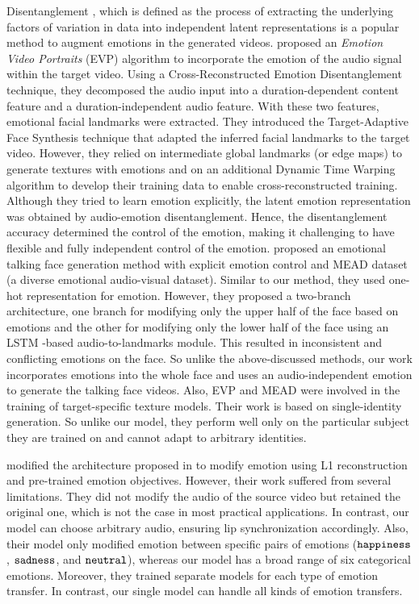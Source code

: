 \documentclass[accepted]{uai2023}
\begin{document}
Disentanglement \citep{Bengio2012RepresentationLA, higgins2017betavae, Mathieu2018DisentanglingDI, Shukla2019PrOSePO, Bhagat2020DisContSV, Bhagat2020DisentanglingMF}, which is defined as the process of extracting the underlying factors of variation in data into independent latent representations is a popular method to augment emotions in the generated videos.
\citet{Ji_2021_CVPR} proposed an \emph{Emotion Video Portraits} (EVP) algorithm to incorporate the emotion of the audio signal within the target video. Using a Cross-Reconstructed Emotion Disentanglement technique, they decomposed the audio input into a duration-dependent content feature and a duration-independent audio feature. With these two features, emotional facial landmarks were extracted. They introduced the Target-Adaptive Face Synthesis technique that adapted the inferred facial landmarks to the target video. However, they relied on intermediate global landmarks (or edge maps) to generate textures with emotions and on an additional Dynamic Time Warping \citep{berndt1994using} algorithm to develop their training data to enable cross-reconstructed training. Although they tried to learn emotion explicitly, the latent emotion representation was obtained by audio-emotion disentanglement. Hence, the disentanglement accuracy determined the control of the emotion, making it challenging to have flexible and fully independent control of the emotion. \citet{wang2020mead} proposed an emotional talking face generation method with explicit emotion control and MEAD dataset (a diverse emotional audio-visual dataset). Similar to our method, they used one-hot representation for emotion. However, they proposed a two-branch architecture, one branch for modifying only the upper half of the face based on emotions and the other for modifying only the lower half of the face using an LSTM \citep{hochreiter1997long}-based audio-to-landmarks module. This resulted in inconsistent and conflicting emotions on the face. So unlike the above-discussed methods, our work incorporates emotions into the whole face and uses an audio-independent emotion to generate the talking face videos. Also, EVP \citep{Ji_2021_CVPR} and MEAD \citep{wang2020mead} were involved in the training of target-specific texture models. Their work is based on single-identity generation. So unlike our model, they perform well only on the particular subject they are trained on and cannot adapt to arbitrary identities.


\citet{magnusson2021invertable} modified the architecture proposed in \citep{prajwal2020lip} to modify emotion using L1 reconstruction and pre-trained emotion objectives. However, their work suffered from several limitations. They did not modify the audio of the source video but retained the original one, which is not the case in most practical applications. 
In contrast, our model can choose arbitrary audio, ensuring lip synchronization accordingly.  Also, their model only modified emotion between specific pairs of emotions ({${\tt happiness}$}, {${\tt sadness}$}, and {${\tt neutral}$}), whereas our model has a broad range of six categorical emotions. Moreover, they trained separate models for each type of emotion transfer. In contrast, our single model can handle all kinds of emotion transfers.
\end{document}
